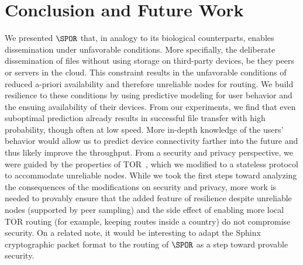 \section{Conclusion and Future Work}

We presented \(\SPOR\) that, in analogy to its biological
counterparts, enables dissemination under unfavorable conditions. More
specifially, the deliberate dissemination of files without using
storage on third-party devices, be they peers or servers in the
cloud. This constraint results in the unfavorable conditions of
reduced a-priori availability and therefore unreliable nodes for
routing. We build resilience to these conditions by using predictive
modeling for user behavior and the ensuing availability of their
devices. From our experiments, we find that even suboptimal prediction
already results in successful file transfer with high probability,
though often at low speed. More in-depth knowledge of the users'
behavior would allow us to predict device connectivity farther into
the future and thus likely improve the throughput. From a security and
privacy perspective, we were guided by the properties of
TOR~\cite{Tor}, which we modified to a stateless protocol to
accommodate unreliable nodes. While we took the first steps toward
analyzing the consequences of the modifications on security and
privacy, more work is needed to provably ensure that the added feature
of resilience despite unreliable nodes (supported by peer sampling)
and the side effect of enabling more local TOR routing (for example,
keeping routes inside a country) do not compromise security. On a
related note, it would be interesting to adapt the
Sphinx~\cite{Sphinx} cryptographic packet format to the routing of
\(\SPOR\) as a step toward provable security.




